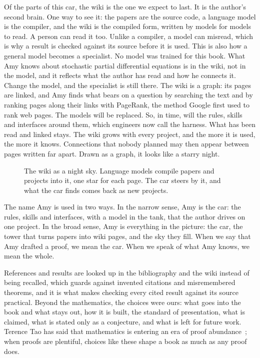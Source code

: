 Of the parts of this car, the wiki is the one we expect to last. It is the
author's second brain. One way to see it: the papers are the source code, a
language model is the compiler, and the wiki is the compiled form, written by
models for models to read. A person can read it too. Unlike a compiler, a model
can misread, which is why a result is checked against its source before it is
used. This is also how a general model becomes a specialist. No model was
trained for this book. What Amy knows about stochastic partial differential
equations is in the wiki, not in the model, and it reflects what the author has
read and how he connects it. Change the model, and the specialist is still
there. The wiki is a graph: its pages are linked, and Amy finds what bears on a
question by searching the text and by ranking pages along their links with
PageRank, the method Google first used to rank web pages. The models will be
replaced. So, in time, will the rules, skills and interfaces around them, which
engineers now call the harness. What has been read and linked stays. The wiki
grows with every project, and the more it is used, the more it knows.
Connections that nobody planned may then appear between pages written far
apart. Drawn as a graph, it looks like a starry night.

\begin{figure}[!htb]
  \centering
  \resizebox{\ifdim\width>\textwidth\textwidth\else\width\fi}{!}{%
  }

  \smallskip
  \parbox{0.9\textwidth}{\centering\footnotesize The wiki as a night sky.
  Language models compile papers and projects into it, one star for each page.
  The car steers by it, and what the car finds comes back as new
  projects.\par}
\end{figure}

The name Amy is used in two ways. In the narrow sense, Amy is the car: the
rules, skills and interfaces, with a model in the tank, that the author drives
on one project. In the broad sense, Amy is everything in the picture: the car,
the tower that turns papers into wiki pages, and the sky they fill. When we say
that Amy drafted a proof, we mean the car. When we speak of what Amy knows, we
mean the whole.

References and results are looked up in the bibliography and the wiki instead
of being recalled, which guards against invented citations and misremembered
theorems, and it is what makes checking every cited result against its source
practical. Beyond the mathematics, the choices were ours: what goes into the
book and what stays out, how it is built, the standard of presentation, what is
claimed, what is stated only as a conjecture, and what is left for future work.
Terence Tao has said that mathematics is entering an era of proof
abundance~\cite{tao:26:math}; when proofs are plentiful, choices like these
shape a book as much as any proof does.

